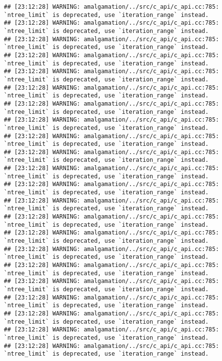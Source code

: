 \documentclass[
]{article}
\begin{document}
\begin{verbatim}
## [23:12:28] WARNING: amalgamation/../src/c_api/c_api.cc:785: `ntree_limit` is deprecated, use `iteration_range` instead.
## [23:12:28] WARNING: amalgamation/../src/c_api/c_api.cc:785: `ntree_limit` is deprecated, use `iteration_range` instead.
## [23:12:28] WARNING: amalgamation/../src/c_api/c_api.cc:785: `ntree_limit` is deprecated, use `iteration_range` instead.
## [23:12:28] WARNING: amalgamation/../src/c_api/c_api.cc:785: `ntree_limit` is deprecated, use `iteration_range` instead.
## [23:12:28] WARNING: amalgamation/../src/c_api/c_api.cc:785: `ntree_limit` is deprecated, use `iteration_range` instead.
## [23:12:28] WARNING: amalgamation/../src/c_api/c_api.cc:785: `ntree_limit` is deprecated, use `iteration_range` instead.
## [23:12:28] WARNING: amalgamation/../src/c_api/c_api.cc:785: `ntree_limit` is deprecated, use `iteration_range` instead.
## [23:12:28] WARNING: amalgamation/../src/c_api/c_api.cc:785: `ntree_limit` is deprecated, use `iteration_range` instead.
## [23:12:28] WARNING: amalgamation/../src/c_api/c_api.cc:785: `ntree_limit` is deprecated, use `iteration_range` instead.
## [23:12:28] WARNING: amalgamation/../src/c_api/c_api.cc:785: `ntree_limit` is deprecated, use `iteration_range` instead.
## [23:12:28] WARNING: amalgamation/../src/c_api/c_api.cc:785: `ntree_limit` is deprecated, use `iteration_range` instead.
## [23:12:28] WARNING: amalgamation/../src/c_api/c_api.cc:785: `ntree_limit` is deprecated, use `iteration_range` instead.
## [23:12:28] WARNING: amalgamation/../src/c_api/c_api.cc:785: `ntree_limit` is deprecated, use `iteration_range` instead.
## [23:12:28] WARNING: amalgamation/../src/c_api/c_api.cc:785: `ntree_limit` is deprecated, use `iteration_range` instead.
## [23:12:28] WARNING: amalgamation/../src/c_api/c_api.cc:785: `ntree_limit` is deprecated, use `iteration_range` instead.
## [23:12:28] WARNING: amalgamation/../src/c_api/c_api.cc:785: `ntree_limit` is deprecated, use `iteration_range` instead.
## [23:12:28] WARNING: amalgamation/../src/c_api/c_api.cc:785: `ntree_limit` is deprecated, use `iteration_range` instead.
## [23:12:28] WARNING: amalgamation/../src/c_api/c_api.cc:785: `ntree_limit` is deprecated, use `iteration_range` instead.
## [23:12:28] WARNING: amalgamation/../src/c_api/c_api.cc:785: `ntree_limit` is deprecated, use `iteration_range` instead.
## [23:12:28] WARNING: amalgamation/../src/c_api/c_api.cc:785: `ntree_limit` is deprecated, use `iteration_range` instead.
## [23:12:28] WARNING: amalgamation/../src/c_api/c_api.cc:785: `ntree_limit` is deprecated, use `iteration_range` instead.
## [23:12:28] WARNING: amalgamation/../src/c_api/c_api.cc:785: `ntree_limit` is deprecated, use `iteration_range` instead.

\end{verbatim}
\end{document}
